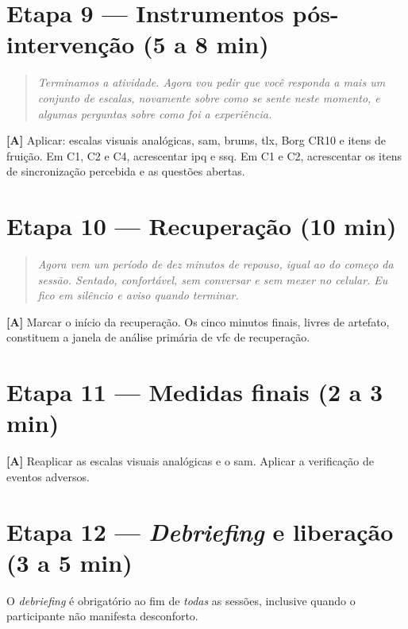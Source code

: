 \section*{Etapa 9 --- Instrumentos pós-intervenção (5 a 8 min)}

\begin{quote}\itshape
Terminamos a atividade. Agora vou pedir que você responda a mais um conjunto de escalas, novamente sobre como se sente \emph{neste momento}, e algumas perguntas sobre como foi a experiência.
\end{quote}

\noindent\textbf{[A]} Aplicar: escalas visuais analógicas, \gls{sam}, \gls{brums}, \gls{tlx}, Borg CR10 e itens de fruição. Em C1, C2 e C4, acrescentar \gls{ipq} e \gls{ssq}. Em C1 e C2, acrescentar os itens de sincronização percebida e as questões abertas.

\section*{Etapa 10 --- Recuperação (10 min)}

\begin{quote}\itshape
Agora vem um período de dez minutos de repouso, igual ao do começo da sessão. Sentado, confortável, sem conversar e sem mexer no celular. Eu fico em silêncio e aviso quando terminar.
\end{quote}

\noindent\textbf{[A]} Marcar o início da recuperação. Os cinco minutos finais, livres de artefato, constituem a janela de análise primária de \gls{vfc} de recuperação.

\section*{Etapa 11 --- Medidas finais (2 a 3 min)}

\noindent\textbf{[A]} Reaplicar as escalas visuais analógicas e o \gls{sam}. Aplicar a verificação de eventos adversos.

\section*{Etapa 12 --- \textit{Debriefing} e liberação (3 a 5 min)}

O \textit{debriefing} é obrigatório ao fim de \emph{todas} as sessões, inclusive quando o participante não manifesta desconforto.

